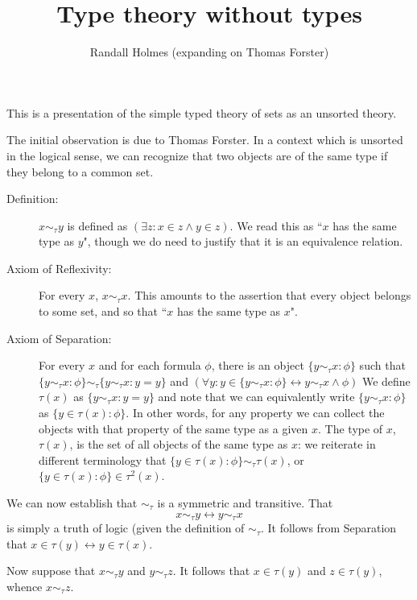 \documentclass[12pt]{article}
\title{Type theory without types}
\author{Randall Holmes (expanding on Thomas Forster)}
\begin{document}
\maketitle

This is a presentation of the simple typed theory of sets as an unsorted theory.

The initial observation is due to Thomas Forster.  In a context which is unsorted in the logical sense, we can recognize that two objects are of the same type if they belong to a common set.

\begin{description}

\item[Definition:]  $x \sim_\tau y$ is defined as $(\exists z:x \in z \wedge y \in z)$.  We read this as ``$x$ has the same type as $y$", though we do need to justify that it is an equivalence relation.



\item[Axiom of Reflexivity:]  For every $x$, $x \sim_\tau x$.  This amounts to the assertion that every object belongs to some set, and so that ``$x$ has the same type as $x$".

\item[Axiom of Separation:]  
For every $x$ and for each formula $\phi$, there is an object $\{y \sim_\tau x:\phi\}$ such that  $\{y \sim_\tau x:\phi\}\sim_\tau\{y \sim_\tau x:y=y\}$ and $(\forall y:y \in \{y \sim_\tau x:\phi\} \leftrightarrow y \sim_\tau x \wedge \phi)$  We define $\tau(x)$ as $\{y \sim_\tau x:y=y\}$ and note that we can equivalently write $\{y \sim_\tau x:\phi\}$ as $\{y \in \tau(x):\phi\}$.  In other words, for any property we can collect the objects with that property of the same type as a given $x$.  The type of $x$, $\tau(x)$, is the set of all objects of the same type as $x$:
we reiterate in different terminology that $\{y \in \tau(x):\phi\} \sim_\tau \tau(x)$, or $\{y \in \tau(x):\phi\} \in \tau^2(x)$.

\end{description}

We can now establish that $\sim_\tau$ is a symmetric and transitive.  That $$x \sim_\tau y \leftrightarrow y \sim_\tau x$$ is simply a truth of logic (given the definition of $\sim_\tau$.
It follows from Separation that $x \in \tau(y) \leftrightarrow y \in \tau(x)$.

Now suppose that $x \sim_\tau y$ and $y \sim_\tau z$.  It follows that $x \in \tau(y)$ and $z \in \tau(y)$, whence $x \sim_\tau z$.
\end{document}
